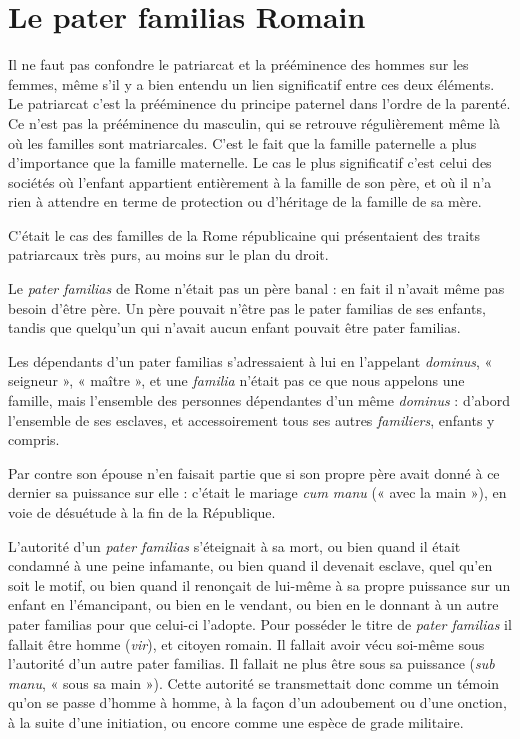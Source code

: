 \section{Le pater familias Romain}


Il ne faut pas confondre  le patriarcat et la prééminence des hommes
sur les femmes, même s'il y a bien entendu un lien significatif entre
ces deux éléments. Le patriarcat c'est la prééminence du principe paternel
dans l'ordre de la parenté. Ce n'est pas la prééminence du masculin, qui
se retrouve régulièrement même là où les familles sont matriarcales. C'est
le fait que la famille paternelle a plus d'importance que la famille maternelle.
Le cas le plus significatif c'est celui des sociétés où l'enfant appartient
entièrement à la famille de son père, et où il n'a rien à attendre en
terme de protection ou d'héritage de la famille de sa mère.

C'était le cas des familles de la Rome républicaine qui présentaient
des traits patriarcaux très purs, au moins sur le plan du droit.

Le \emph{pater familias} de Rome n'était pas un père banal : en fait il n'avait
même pas besoin d'être père. Un père pouvait n'être pas le pater familias
de ses enfants, tandis que quelqu'un qui n'avait aucun enfant pouvait être
pater familias.

Les dépendants d'un pater familias s'adressaient à lui en l'appelant
\emph{dominus}, « seigneur », « maître », et une \emph{familia} n'était pas ce que nous
appelons une famille, mais l'ensemble des personnes dépendantes d'un même
\emph{dominus} : d'abord l'ensemble de ses esclaves, et accessoirement tous ses
autres \emph{familiers}, enfants y compris.

Par contre son épouse n'en faisait partie que si son propre père
avait donné à ce dernier sa puissance sur elle : c'était le mariage \emph{cum manu}
(« avec la main »), en voie de désuétude à la fin de la République.

L'autorité d'un \emph{pater familias} s'éteignait à sa mort, ou bien quand il
était condamné à une peine infamante, ou bien quand il devenait esclave,
quel qu'en soit le motif, ou bien quand il renonçait de lui-même à sa
propre puissance sur un enfant en l'émancipant, ou bien en le vendant,
ou bien en le donnant à un autre pater familias pour que celui-ci l'adopte.
Pour posséder le titre de \emph{pater familias} il fallait être homme (\emph{vir}), et citoyen
romain. Il fallait avoir vécu soi-même sous l'autorité d'un autre pater familias.
Il fallait ne plus être sous sa puissance (\emph{sub manu}, « sous sa main »).
Cette autorité se transmettait donc comme un témoin qu'on se passe
d'homme à homme, à la façon d'un adoubement ou d'une onction, à la
suite d'une initiation, ou encore comme une espèce de grade militaire.

